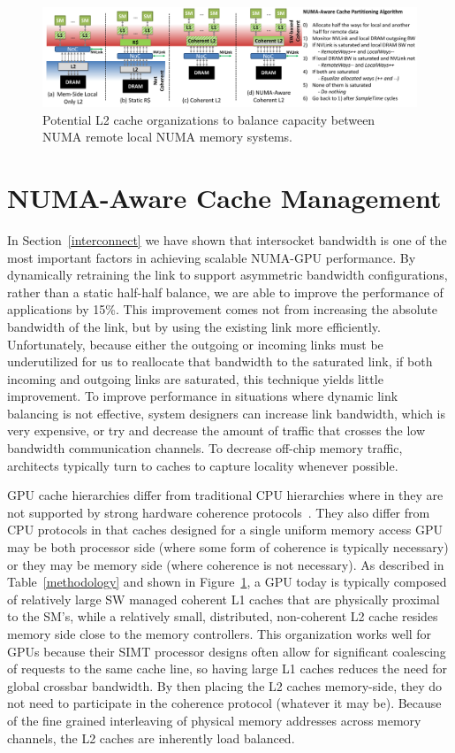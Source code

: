 \begin{figure}[t]
    \centering
    \includegraphics[width=1.0\textwidth]{figures/cache_configurations_static_dynamic.pdf}
    \caption{Potential L2 cache organizations to balance capacity between NUMA remote
    local NUMA memory systems.}
    \label{fig:cacheorg}
\end{figure}

\section{NUMA-Aware Cache Management}
\label{caching}
In Section~\ref{interconnect} we have shown that intersocket bandwidth is one
of the most important factors in achieving scalable NUMA-GPU performance. By
dynamically retraining the link to support asymmetric bandwidth configurations,
rather than a static half-half balance, we are able to improve the performance
of applications by 15\%.  This improvement comes not from increasing the
absolute bandwidth of the link, but by using the existing link more efficiently.
Unfortunately, because either the outgoing or incoming links must be underutilized
for us to reallocate that bandwidth to the saturated link, if both incoming and
outgoing links are saturated, this technique yields little improvement.
To improve performance in situations where dynamic link balancing is not effective,
system designers can increase link bandwidth, which is very expensive,
or try and decrease the amount of traffic that crosses the low bandwidth
communication channels.  To decrease off-chip memory traffic, architects typically
turn to caches to capture locality whenever possible.

GPU cache hierarchies differ from traditional CPU hierarchies where in they are
not supported by strong hardware coherence protocols~\cite{XXX}.  They also differ
from CPU protocols in that caches designed for a single uniform memory access GPU
may be both processor side (where some form of coherence is typically necessary)
or they may be memory side (where coherence is not necessary).  As described in
Table~\ref{methodology} and shown in Figure~\ref{fig:cacheorg}, a GPU today is
typically composed of relatively large SW managed coherent L1 caches that are 
physically proximal to the SM's, while a relatively small, distributed, non-coherent 
L2 cache resides memory side close to the memory controllers.  This
organization works well for GPUs because their SIMT processor designs often allow
for significant coalescing of requests to the same cache line, so having large
L1 caches reduces the need for global crossbar bandwidth.  By then placing the L2
caches memory-side, they do not need to participate in the coherence protocol (whatever
it may be).  Because of the fine grained interleaving of physical memory addresses
across memory channels, the L2 caches are inherently load balanced.

